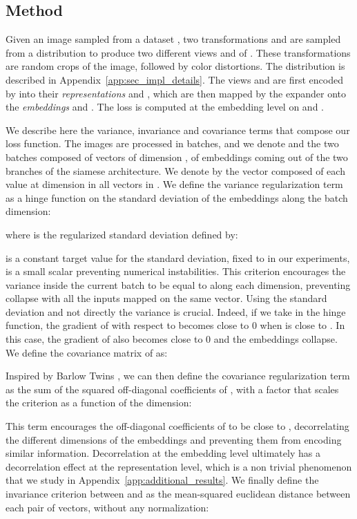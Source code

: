 \documentclass{article}
\begin{document}
\subsection{Method} \label{sec:method_details}

Given an image  sampled from a dataset , two transformations  and  are sampled from a distribution  to produce two different views  and  of . These transformations are random crops of the image, followed by color distortions. The distribution  is described in Appendix~\ref{app:sec_impl_details}. The views  and  are first encoded by  into their {\em representations}  and , which are then mapped by the expander  onto the {\em embeddings}  and . The loss is computed at the embedding level on  and .

We describe here the variance, invariance and covariance terms that compose our loss function. The images are processed in batches, and we denote  and  the two batches composed of  vectors of dimension , of embeddings coming out of the two branches of the siamese architecture. We denote by  the vector composed of each value at dimension  in all vectors in . We define the variance regularization term  as a hinge function on the standard deviation of the embeddings along the batch dimension:

where  is the regularized standard deviation defined by:

 is a constant target value for the standard deviation, fixed to  in our experiments,  is a small scalar preventing numerical instabilities. This criterion encourages the variance inside the current batch to be equal to  along each dimension, preventing collapse with all the inputs mapped on the same vector. Using the standard deviation and not directly the variance is crucial. Indeed, if we take  in the hinge function, the gradient of  with respect to  becomes close to 0 when  is close to . In this case, the gradient of  also becomes close to 0 and the embeddings collapse. We define the covariance matrix of  as:

Inspired by Barlow Twins \cite{zbontar2021barlow}, we can then define the covariance regularization term  as the sum of the squared off-diagonal coefficients of , with a factor  that scales the criterion as a function of the dimension:

This term encourages the off-diagonal coefficients of  to be close to , decorrelating the different dimensions of the embeddings and preventing them from encoding similar information. Decorrelation at the embedding level ultimately has a decorrelation effect at the representation level, which is a non trivial phenomenon that we study in Appendix~\ref{app:additional_results}. We finally define the invariance criterion  between  and  as the mean-squared euclidean distance between each pair of vectors, without any normalization:
\end{document}
